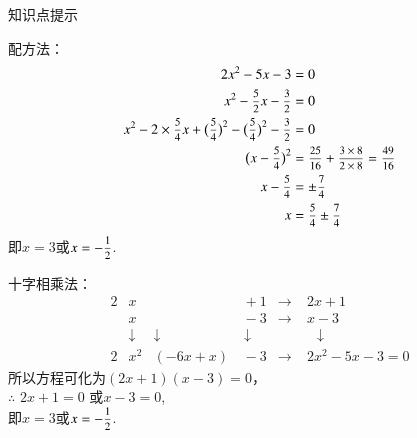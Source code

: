 \begin{exercise}
\begin{framed}{\heiti 知识点提示}
\begin{itemize}
              \begin{minipage}[t]{0.52\linewidth}\vspace{-0.5\baselineskip}
                  \begin{flushleft}
                    \hspace{2.5em}配方法：
                      \[\begin{aligned}
                        2x^2-5x-3&=0\\
                        x^2-\mfrac52 x-\mfrac32&=0\\
                        x^2-2\times\mfrac54x+\bigl(\mfrac54\bigr)^2-\bigl(\mfrac54\bigr)^2-\mfrac32&=0\\
                        \bigl(x-\mfrac54\bigr)^2 &=\mfrac{25}{16}+\mfrac{3\times8}{2\times8}=\mfrac{49}{16}\\
                        x-\mfrac54 &=\pm\mfrac74\\
                        x &=\mfrac54 \pm\mfrac74
                      \end{aligned}\]
                    \hspace{2.5em}即$x=3$或$x=-\mfrac12$.
                  \end{flushleft}
              \end{minipage}\hspace{2em}
              \begin{minipage}[t]{0.48\linewidth}\vspace{-0.5\baselineskip}
                  \begin{flushleft}
                    十字相乘法：
                    \[\begin{aligned}
                        2&x            &\quad           &\,+1           &\longrightarrow &\;2x+1\\
                        &x             &\quad           &\,-3           &\longrightarrow &\;x-3\\
                        &\downarrow  &\downarrow\qquad  &\;\downarrow   &\quad           &\quad\downarrow\\
                        2&x^2        &(-6x+x)           &\,-3           &\longrightarrow &\;2x^2-5x-3=0
                      \end{aligned}\]
                    所以方程可化为$(2x+1)(x-3)=0$，\\
                    $\therefore$ $2x+1=0$ 或$x-3=0$,\\
                    即$x=3$或$x=-\mfrac12$.
                  \end{flushleft}

\end{minipage}
\end{itemize}
\end{framed}
\end{exercise}
